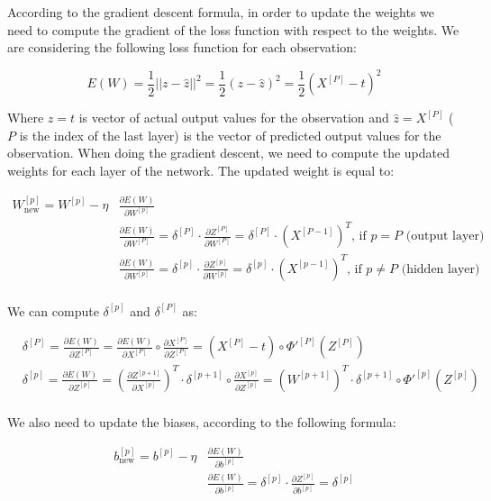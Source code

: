 \documentclass{article}
\begin{document}
According to the gradient descent formula, in order to update the weights we need to compute the gradient of the loss function with respect to the weights.
We are considering the following loss function for each observation:

\[ E(W) = \frac{1}{2} || z-\hat{z} ||^2 = \frac{1}{2} (z-\hat{z})^2 = \frac{1}{2} (X^{[P]} - t)^2 \]


Where $z = t$ is vector of actual output values for the observation and $\hat{z} = X^{[P]}$ ($P$ is the index of the last layer) is the vector of predicted output values for the observation. 
When doing the gradient descent, we need to compute the updated weights for each layer of the network.
The updated weight is equal to:

\begin{align*}
    W^{[p]}_{\text{new}} = W^{[p]} - \eta &\frac{\partial E(W)}{\partial W^{[p]}} \\
    &\frac{\partial E(W)}{\partial W^{[P]}} = \delta^{[P]} \cdot \frac{\partial Z^{[P]}}{\partial W^{[P]}} = \delta^{[P]} \cdot (X^{[P-1]})^T  \text{,      if } p = P \text{ (output layer)} \\
    &\frac{\partial E(W)}{\partial W^{[p]}} = \delta^{[p]} \cdot \frac{\partial Z^{[p]}}{\partial W^{[p]}} = \delta^{[p]} \cdot (X^{[p-1]})^T  \text{,      if } p \neq P \text{ (hidden layer)} \\
\end{align*}

We can compute $\delta^{[p]}$ and $\delta^{[P]}$ as:

\begin{align*}
    &\delta^{[P]} = \frac{\partial E(W)}{\partial Z^{[P]}} = \frac{\partial E(W)}{\partial X^{[P]}} \circ \frac{\partial X^{[P]}}{\partial Z^{[P]}} = (X^{[P]}-t) \circ \Phi'^{[P]}(Z^{[P]}) \\
    &\delta^{[p]} = \frac{\partial E(W)}{\partial Z^{[p]}} = \left( \frac{\partial Z^{[p+1]}}{\partial X^{[p]}} \right)^T \cdot \delta^{[p+1]} \circ \frac{\partial X^{[p]}}{\partial Z^{[p]}} = (W^{[p+1]})^T \cdot \delta^{[p+1]} \circ \Phi'^{[p]}(Z^{[p]}) \\
\end{align*}

We also need to update the biases, according to the following formula:

\begin{align*}
    b^{[p]}_{\text{new}} = b^{[p]} - \eta &\frac{\partial E(W)}{\partial b^{[p]}} \\
    &\frac{\partial E(W)}{\partial b^{[p]}} = \delta^{[p]} \cdot \frac{\partial Z^{[p]}}{\partial b^{[p]}} = \delta^{[p]} \\
\end{align*}
\end{document}
